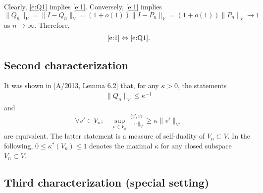 \documentclass[12pt]{article}
\newcommand{\norm}[2]{\|#1\|_{#2}}
\newcommand{\scalar}[2]{\langle#1\rangle_{#2}}
\begin{document}
	
	Clearly, \eqref{e:Q1} implies \eqref{e:1}.
	Conversely, 
	\eqref{e:1} implies
	$
		\norm{Q_n}{V} = \norm{I - Q_n}{V}
		=
		(1 + o(1))
		\norm{I - P_n}{V}
		=
		(1 + o(1))
		\norm{P_n}{V}
		\to 1
	$
	as $n \to \infty$.
	Therefore, 
	\begin{align}
		\eqref{e:1}
		\Leftrightarrow
		\eqref{e:Q1}
		.
	\end{align}
	
	
	\subsection*{Second characterization}
	
	
	It was shown in [A/2013, Lemma 6.2] that,
	for any $\kappa > 0$,
	the statements
	\begin{align}
		\label{e:A-Qk}
		\norm{Q_n}{V} \leq \kappa^{-1}
	\end{align}
	and
	\begin{align}
		\label{e:A-Vk}
		\forall v' \in V_n:
		\quad
		\sup_{v \in V_n}
		\frac{
			\scalar{v', v}{}
		}{
			\norm{v}{V}
		}
		\geq
		\kappa
		\norm{v'}{V'} 
	\end{align}
	are equivalent.
	The latter statement is a measure of self-duality of $V_n \subset V$.
	In the following, $0 \leq \kappa^*(V_n) \leq 1$ denotes 
	the maximal $\kappa$
	for any closed subspace $V_n \subset V$.
	
	
	\subsection*{Third characterization (special setting)}
	
	
\end{document}
